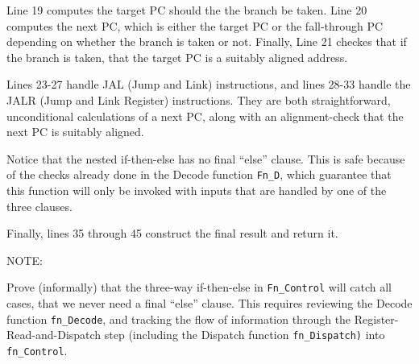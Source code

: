 Line 19 computes the target PC should the the branch be taken.  Line
20 computes the next PC, which is either the target PC or the
fall-through PC depending on whether the branch is taken or not.
Finally, Line 21 checkes that if the branch is taken, that the target
PC is a suitably aligned address.

Lines 23-27 handle JAL (Jump and Link) instructions, and lines 28-33
handle the JALR (Jump and Link Register) instructions.  They are both
straightforward, unconditional calculations of a next PC, along with
an alignment-check that the next PC is suitably aligned.

Notice that the nested if-then-else has no final ``else'' clause.
This is safe because of the checks already done in the Decode function
\verb|Fn_D|, which guarantee that this function will only be invoked
with inputs that are handled by one of the three clauses.

Finally, lines 35 through 45 construct the final result and return it.

\vspace*{2ex}

NOTE:

\vspace*{2ex}

\hdivider

\Exercise

Prove (informally) that the three-way if-then-else in
\verb|Fn_Control| will catch all cases, {\ie} that we never need a
final ``else'' clause.  This requires reviewing the Decode function
\verb|fn_Decode|, and tracking the flow of information through the
Register-Read-and-Dispatch step (including the Dispatch function
\verb|fn_Dispatch)| into \verb|fn_Control|.

